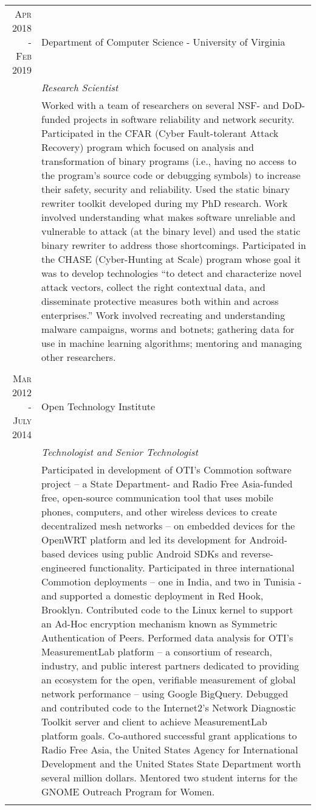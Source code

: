 \documentclass[a4paper,10pt]{article} %
\begin{document}
\begin{tabular}{r|p{11cm}}
\textsc{Apr 2018 - Feb 2019} & Department of Computer Science - University of Virginia \\
& \emph{Research Scientist}\\ 
& \footnotesize{Worked with a team of researchers on several NSF- and DoD-funded projects in software reliability and network security. Participated in the CFAR (Cyber Fault-tolerant Attack Recovery) program which focused on analysis and transformation of binary programs (i.e., having no access to the program's source code or debugging symbols) to increase their safety, security and reliability. Used the static binary rewriter toolkit developed during my PhD research. Work involved understanding what makes software unreliable and vulnerable to attack (at the binary level) and used the static binary rewriter to address those shortcomings. Participated in the CHASE (Cyber-Hunting at Scale) program whose goal it was to develop technologies ``to detect and characterize novel attack vectors, collect the right contextual data, and disseminate protective measures both within and across enterprises.'' Work involved recreating and understanding malware campaigns, worms and botnets; gathering data for use in machine learning algorithms; mentoring and managing other researchers.}\\
\multicolumn{2}{c}{ } \\


\textsc{Mar 2012 - July 2014} & Open Technology Institute \\
& \emph{Technologist and Senior Technologist}\\ 
& \footnotesize{Participated in development of OTI’s Commotion software project – a State Department- and Radio Free Asia-funded free, open-source communication tool that uses mobile phones, computers, and other wireless devices to create decentralized mesh networks – on embedded devices for the OpenWRT platform and led its development for Android-based devices using public Android SDKs and reverse-engineered functionality. Participated in three international Commotion deployments – one in India, and two in Tunisia - and supported a domestic deployment in Red Hook, Brooklyn. Contributed code to the Linux kernel to support an Ad-Hoc encryption mechanism known as Symmetric Authentication of Peers. Performed data analysis for OTI’s MeasurementLab platform – a consortium of research, industry, and public interest partners dedicated to providing an ecosystem for the open, verifiable measurement of global network performance – using Google BigQuery. Debugged and contributed code to the Internet2’s Network Diagnostic Toolkit server and client to achieve MeasurementLab platform goals. Co-authored successful grant applications to Radio Free Asia, the United States Agency for International Development and the United States State Department worth several million dollars. Mentored two student interns for the GNOME Outreach Program for Women.}\\
\multicolumn{2}{c}{	} \\


\end{tabular}
\end{document}
